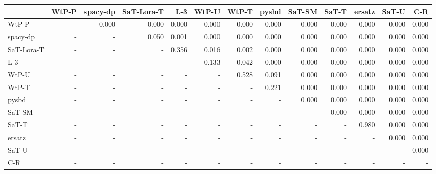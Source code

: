 \begin{tabular}{lrrrrrrrrrrrr}
\toprule
 & WtP-P & spacy-dp & SaT-Lora-T & L-3 & WtP-U & WtP-T & pysbd & SaT-SM & SaT-T & ersatz & SaT-U & C-R \\
\midrule
WtP-P & - & 0.000 & 0.000 & 0.000 & 0.000 & 0.000 & 0.000 & 0.000 & 0.000 & 0.000 & 0.000 & 0.000 \\
spacy-dp & - & - & 0.050 & 0.001 & 0.000 & 0.000 & 0.000 & 0.000 & 0.000 & 0.000 & 0.000 & 0.000 \\
SaT-Lora-T & - & - & - & 0.356 & 0.016 & 0.002 & 0.000 & 0.000 & 0.000 & 0.000 & 0.000 & 0.000 \\
L-3 & - & - & - & - & 0.133 & 0.042 & 0.000 & 0.000 & 0.000 & 0.000 & 0.000 & 0.000 \\
WtP-U & - & - & - & - & - & 0.528 & 0.091 & 0.000 & 0.000 & 0.000 & 0.000 & 0.000 \\
WtP-T & - & - & - & - & - & - & 0.221 & 0.000 & 0.000 & 0.000 & 0.000 & 0.000 \\
pysbd & - & - & - & - & - & - & - & 0.000 & 0.000 & 0.000 & 0.000 & 0.000 \\
SaT-SM & - & - & - & - & - & - & - & - & 0.000 & 0.000 & 0.000 & 0.000 \\
SaT-T & - & - & - & - & - & - & - & - & - & 0.980 & 0.000 & 0.000 \\
ersatz & - & - & - & - & - & - & - & - & - & - & 0.000 & 0.000 \\
SaT-U & - & - & - & - & - & - & - & - & - & - & - & 0.000 \\
C-R & - & - & - & - & - & - & - & - & - & - & - & - \\
\bottomrule
\end{tabular}

